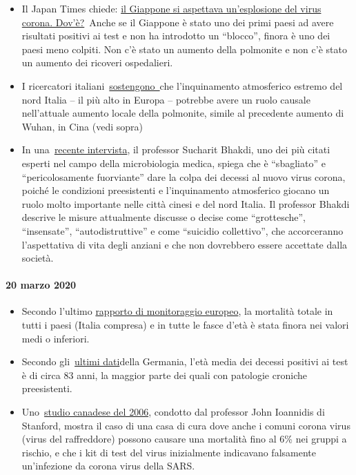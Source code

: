 \begin{itemize}
\tightlist
\item
  Il Japan Times chiede:
  \href{https://www.japantimes.co.jp/news/2020/03/20/national/coronavirus-explosion-expected-japan/}{il
  Giappone si aspettava un'esplosione del virus corona. Dov'è?}~Anche se
  il Giappone è stato uno dei primi paesi ad avere risultati positivi ai
  test e non ha introdotto un ``blocco'', finora è uno dei paesi meno
  colpiti. Non c'è stato un aumento della polmonite e non c'è stato un
  aumento dei ricoveri ospedalieri.
\item
  I ricercatori
  italiani~\href{https://www.heise.de/tp/features/Feinstaubpartikel-als-Viren-Vehikel-4687454.html}{sostengono~}che
  l'inquinamento atmosferico estremo del nord Italia -- il più alto in
  Europa -- potrebbe avere un ruolo causale nell'attuale aumento locale
  della polmonite, simile al precedente aumento di Wuhan, in Cina (vedi
  sopra)
\item
  In una~\href{https://www.youtube.com/watch?v=JBB9bA-gXL4}{recente
  intervista}, il professor Sucharit Bhakdi, uno dei più citati esperti
  nel campo della microbiologia medica, spiega che è ``sbagliato'' e
  ``pericolosamente fuorviante'' dare la colpa dei decessi al nuovo
  virus corona, poiché le condizioni preesistenti e l'inquinamento
  atmosferico giocano un ruolo molto importante nelle città cinesi e del
  nord Italia. Il professor Bhakdi descrive le misure attualmente
  discusse o decise come ``grottesche'', ``insensate'',
  ``autodistruttive'' e come ``suicidio collettivo'', che accorceranno
  l'aspettativa di vita degli anziani e che non dovrebbero essere
  accettate dalla società.
\end{itemize}

\hypertarget{20-marzo-2020}{%
\paragraph{20 marzo 2020}\label{20-marzo-2020}}

\begin{itemize}
\tightlist
\item
  Secondo l'ultimo \href{https://www.euromomo.eu/index.html}{rapporto di
  monitoraggio europeo}, la mortalità totale in tutti i paesi (Italia
  compresa) e in tutte le fasce d'età è stata finora nei valori medi o
  inferiori.
\item
  Secondo
  gli~\href{https://de.wikipedia.org/wiki/COVID-19-Pandemie_in_Deutschland\#Todesf\%C3\%A4lle_in_den_Medien}{ultimi
  dati}della Germania, l'età media dei decessi positivi ai test è di
  circa 83 anni, la maggior parte dei quali con patologie croniche
  preesistenti.
\item
  Uno~\href{https://www.ncbi.nlm.nih.gov/pmc/articles/PMC2095096/}{studio
  canadese del 2006}, condotto dal professor John Ioannidis di Stanford,
  mostra il caso di una casa di cura dove anche i comuni corona virus
  (virus del raffreddore) possono causare una mortalità fino al 6\% nei
  gruppi a rischio, e che i kit di test del virus inizialmente
  indicavano falsamente un'infezione da corona virus della SARS.
\end{itemize}

